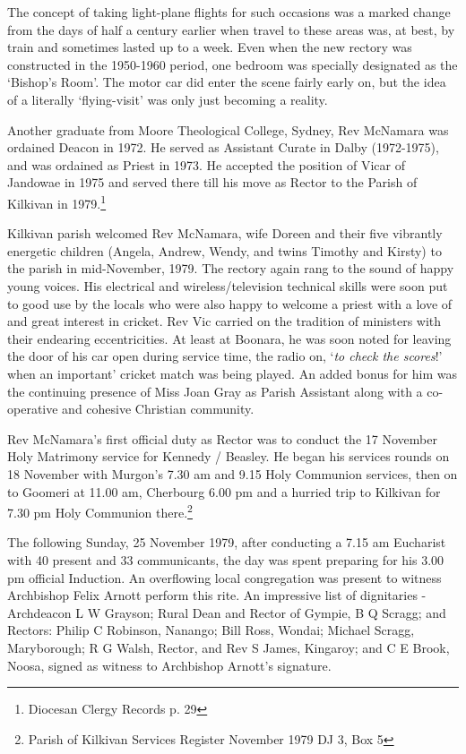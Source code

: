 The concept of taking light-plane flights for such occasions was a marked change from the days of half a century earlier when travel to these areas was, at best, by train and sometimes lasted up to a week. Even when the new rectory was constructed in the 1950-1960 period, one bedroom was specially designated as the `Bishop's Room'. The motor car did enter the scene fairly early on, but the idea of a literally `flying-visit' was only just becoming a reality.

Another graduate from Moore Theological College, Sydney, Rev McNamara was ordained Deacon in 1972. He served as Assistant Curate in Dalby (1972-1975), and was ordained as Priest in 1973. He accepted the position of Vicar of Jandowae in 1975 and served there till his move as Rector to the Parish of Kilkivan in 1979.\footnote{Diocesan Clergy Records p. 29}

Kilkivan parish welcomed Rev McNamara, wife Doreen and their five vibrantly energetic children (Angela, Andrew, Wendy, and twins Timothy and Kirsty) to the parish in mid-November, 1979. The rectory again rang to the sound of happy young voices. His electrical and wireless/television technical skills were soon put to good use by the locals who were also happy to welcome a priest with a love of and great interest in cricket. Rev Vic carried on the tradition of ministers with their endearing eccentricities. At least at Boonara, he was soon noted for leaving the door of his car open during service time, the radio on, `\emph{to check the scores}!' when an important' cricket match was being played. An added bonus for him was the continuing presence of Miss Joan Gray as Parish Assistant along with a co-operative and cohesive Christian community.

Rev McNamara's first official duty as Rector was to conduct the 17 November Holy Matrimony service for Kennedy / Beasley. He began his services rounds on 18 November with Murgon's 7.30 am and 9.15 Holy Communion services, then on to Goomeri at 11.00 am, Cherbourg 6.00 pm and a hurried trip to Kilkivan for 7.30 pm Holy Communion there.\footnote{Parish of Kilkivan Services Register November 1979 DJ 3, Box 5}

The following Sunday, 25 November 1979, after conducting a 7.15 am Eucharist with 40 present and 33 communicants, the day was spent preparing for his 3.00 pm official Induction. An overflowing local congregation was present to witness Archbishop Felix Arnott perform this rite. An impressive list of dignitaries - Archdeacon L W Grayson; Rural Dean and Rector of Gympie, B Q Scragg; and Rectors: Philip C Robinson, Nanango; Bill Ross, Wondai; Michael Scragg, Maryborough; R G Walsh, Rector, and Rev S James, Kingaroy; and C E Brook, Noosa, signed as witness to Archbishop Arnott's signature.

